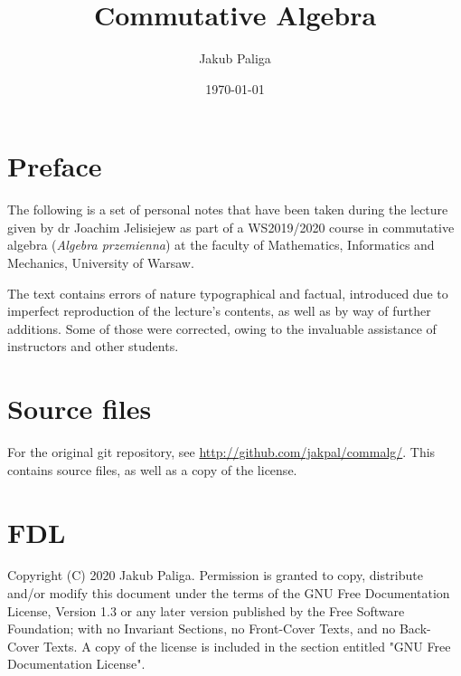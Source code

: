 \author{Jakub Paliga}
\subject{Lecture notes for}
\title{Commutative Algebra}
\date{\today}

\maketitle

\section{Preface}
The following is a set of personal notes that have been taken during the lecture given by dr Joachim Jelisiejew as part of a WS2019/2020 course in commutative algebra (\textit{Algebra przemienna}) at the faculty of Mathematics, Informatics and Mechanics, University of Warsaw.

The text contains errors of nature typographical and factual, introduced due to imperfect reproduction of the lecture's contents, as well as by way of further additions. Some of those were corrected, owing to the invaluable assistance of instructors and other students.

\section{Source files}
For the original git repository, see \url{http://github.com/jakpal/commalg/}. This contains source files, as well as a copy of the license.

\section{FDL}
Copyright (C)  2020  Jakub Paliga.
Permission is granted to copy, distribute and/or modify this document
under the terms of the GNU Free Documentation License, Version 1.3
or any later version published by the Free Software Foundation;
with no Invariant Sections, no Front-Cover Texts, and no Back-Cover Texts.
A copy of the license is included in the section entitled "GNU
Free Documentation License".
    


